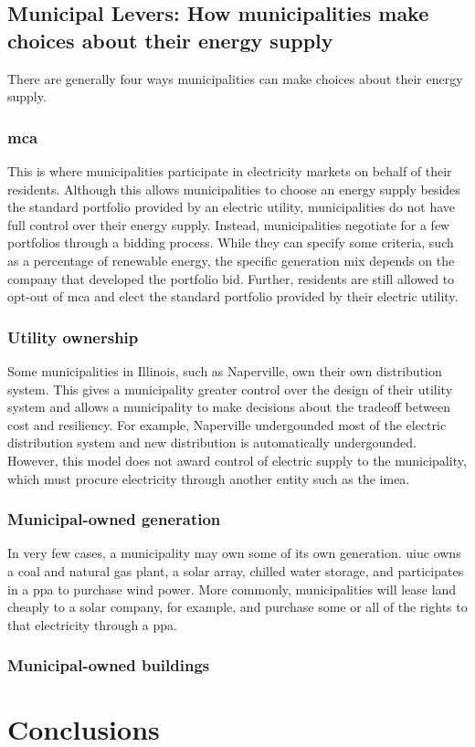 \section{Municipal Levers: How municipalities make choices about their energy supply}
There are generally four ways municipalities can make choices about their energy supply.

\subsection{\ac{mca}}
This is where municipalities participate in electricity markets on behalf of
their residents. Although this allows municipalities to choose an energy supply
besides the standard portfolio provided by an electric utility, municipalities
do not have full control over their energy supply. Instead, municipalities
negotiate for a few portfolios through a bidding process. While they can specify
some criteria, such as a percentage of renewable energy, the specific generation
mix depends on the company that developed the portfolio bid. Further, residents
are still allowed to opt-out of \ac{mca} and elect the standard portfolio
provided by their electric utility.

\subsection{Utility ownership}
Some municipalities in Illinois, such as Naperville, own their own distribution
system. This gives a municipality greater control over the design of their
utility system and allows a municipality to make decisions about the tradeoff
between cost and resiliency. For example, Naperville undergounded most of the
electric distribution system and new distribution is automatically undergounded.
However, this model does not award control of electric supply to the
municipality, which must procure electricity through another entity such as the
\acf{imea}.

\subsection{Municipal-owned generation}
In very few cases, a municipality may own some of its own generation. \ac{uiuc}
owns a coal and natural gas plant, a solar array, chilled water storage, and
participates in a \ac{ppa} to purchase wind power. More commonly, municipalities
will lease land cheaply to a solar company, for example, and purchase some or all
of the rights to that electricity through a \ac{ppa}. 

\subsection{Municipal-owned buildings}

\chapter{Conclusions}
